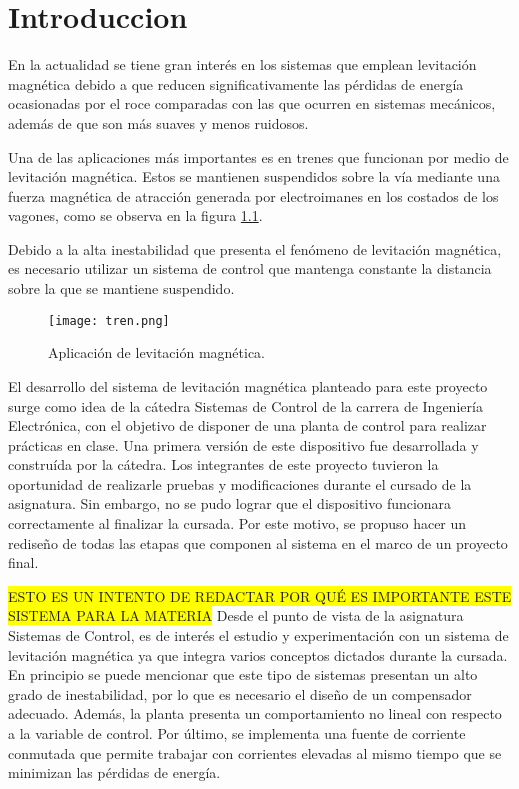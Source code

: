 \chapter{Introduccion}  \label{cap:Introducción}

\noindent En la actualidad se tiene gran interés en los sistemas que emplean levitación magnética debido a que reducen significativamente las pérdidas de energía ocasionadas por el roce comparadas con las que ocurren en sistemas mecánicos, además de que son más suaves y menos ruidosos. 

\noindent Una de las aplicaciones  más importantes es en trenes que funcionan por medio de levitación magnética. Estos se mantienen suspendidos sobre la vía mediante una fuerza magnética de atracción generada por electroimanes en los costados de los vagones, como se  observa en la figura \ref{fig:img_tren}.

\noindent Debido a la alta inestabilidad que presenta el fenómeno de levitación magnética, es necesario utilizar un sistema de control que mantenga constante la distancia sobre la que se mantiene suspendido.

\begin{figure}[H]
	\centering
	\texttt{[image: tren.png]}
	\caption{Aplicación de levitación magnética.}
	\label{fig:img_tren}
\end{figure}

\noindent El desarrollo del sistema de levitación magnética planteado para este proyecto surge como idea de la cátedra Sistemas de Control de la carrera de Ingeniería Electrónica, con el objetivo de disponer de una planta de control para realizar prácticas en clase. Una primera versión de este dispositivo fue desarrollada y construída por la cátedra. Los integrantes de este proyecto tuvieron la oportunidad de realizarle pruebas y modificaciones durante el cursado de la asignatura. Sin embargo, no se pudo lograr que el dispositivo funcionara correctamente al finalizar la cursada. Por este motivo, se propuso hacer un rediseño de todas las etapas que componen al sistema en el marco de un proyecto final.

\colorbox{yellow}{ESTO ES UN INTENTO DE REDACTAR POR QUÉ ES IMPORTANTE ESTE SISTEMA PARA LA MATERIA}
Desde el punto de vista de la asignatura Sistemas de Control, es de interés el estudio y experimentación con un sistema de levitación magnética ya que integra varios conceptos dictados durante la cursada. En principio se puede mencionar que este tipo de sistemas presentan un alto grado de inestabilidad, por lo que es necesario el diseño de un compensador adecuado. Además, la planta presenta un comportamiento no lineal con respecto a la variable de control. Por último, se implementa una fuente de corriente conmutada que permite trabajar con corrientes elevadas al mismo tiempo que se minimizan las pérdidas de energía.

